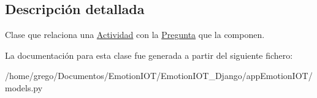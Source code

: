 \subsection{Descripción detallada}
Clase que relaciona una \hyperlink{classappEmotionIOT_1_1models_1_1Actividad}{Actividad} con la \hyperlink{classappEmotionIOT_1_1models_1_1Pregunta}{Pregunta} que la componen. 

La documentación para esta clase fue generada a partir del siguiente fichero\+:\begin{DoxyCompactItemize}
\item 
/home/grego/\+Documentos/\+Emotion\+I\+O\+T/\+Emotion\+I\+O\+T\+\_\+\+Django/app\+Emotion\+I\+O\+T/models.\+py\end{DoxyCompactItemize}
